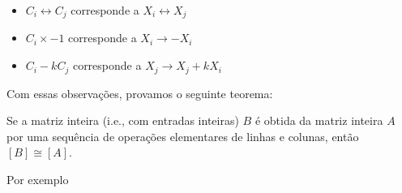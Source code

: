 	\begin{itemize}
		\item $C_i\leftrightarrow C_j$ corresponde a $X_i\leftrightarrow X_j$
		\item $C_i\times-1$ corresponde a $X_i\to -X_i$
		\item $C_i -kC_j$ corresponde a $X_j\to X_j + kX_i$
	\end{itemize}
	\par\vspace{0.3cm} Com essas observações, provamos o seguinte teorema:
	\begin{theorem}
		\label{equivalencia matrizes}
		Se a matriz inteira (i.e., com entradas inteiras) $B$ é obtida da matriz inteira $A$ por uma sequência de operações elementares de linhas e colunas, então $[B]\cong[A]$.
	\end{theorem}
	\par\vspace{0.3cm} Por exemplo
